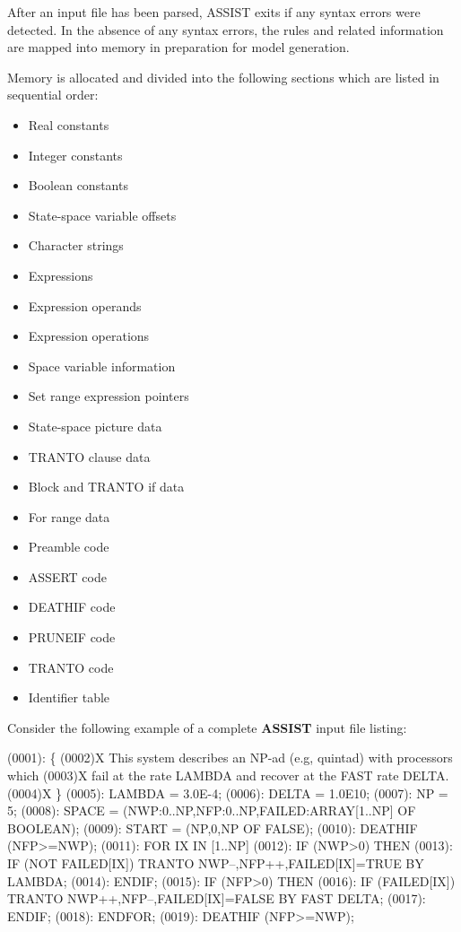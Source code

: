 After an input file has been parsed, ASSIST exits if any syntax errors
were detected.   In the absence of any syntax errors, the rules and related
information are mapped into memory in preparation for model generation.

Memory is allocated and divided into the following sections which are
listed in sequential order:
\begin{itemize}
\item Real constants
\item Integer constants
\item Boolean constants
\item State-space variable offsets
\item Character strings
\item Expressions
\item Expression operands
\item Expression operations
\item Space variable information
\item Set range expression pointers
\item State-space picture data
\item TRANTO clause data
\item Block and TRANTO if data
\item For range data
\item Preamble code
\item ASSERT code
\item DEATHIF code
\item PRUNEIF code
\item TRANTO code
\item Identifier table
\end{itemize}

Consider the following example of a complete {\bf ASSIST} input file listing:
\begin{logfileexample}
(0001): \{
(0002)X     This system describes an NP-ad (e.g, quintad) with processors which
(0003)X     fail at the rate LAMBDA and recover at the FAST rate DELTA.
(0004)X \}
(0005): LAMBDA = 3.0E-4;
(0006): DELTA = 1.0E10;
(0007): NP = 5;
(0008): SPACE = (NWP:0..NP,NFP:0..NP,FAILED:ARRAY[1..NP] OF BOOLEAN);
(0009): START = (NP,0,NP OF FALSE);
(0010): DEATHIF (NFP>=NWP);
(0011): FOR IX IN [1..NP]
(0012):     IF (NWP>0) THEN
(0013):        IF (NOT FAILED[IX]) TRANTO NWP--,NFP++,FAILED[IX]=TRUE BY LAMBDA;
(0014):     ENDIF;
(0015):     IF (NFP>0) THEN
(0016):        IF (FAILED[IX]) TRANTO NWP++,NFP--,FAILED[IX]=FALSE BY FAST DELTA;
(0017):     ENDIF;
(0018): ENDFOR;
(0019): DEATHIF (NFP>=NWP);
\end{logfileexample}

